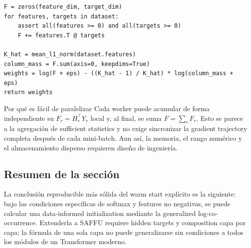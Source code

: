 \begin{lstlisting}[caption={Pseudocódigo shape-first del warm start explícito de una softmax layer}]
F = zeros(feature_dim, target_dim)
for features, targets in dataset:
    assert all(features >= 0) and all(targets >= 0)
    F += features.T @ targets

K_hat = mean_l1_norm(dataset.features)
column_mass = F.sum(axis=0, keepdims=True)
weights = log(F + eps) - ((K_hat - 1) / K_hat) * log(column_mass + eps)
return weights
\end{lstlisting}

\begin{knowledgebox}{Por qué es fácil de paralelizar}
Cada worker puede acumular de forma independiente su $F_r=H_r^\top Y_r$ local y, al final, se suma $F=\sum_rF_r$. Esto se parece a la agregación de sufficient statistics y no exige sincronizar la gradient trajectory completa después de cada mini-batch. Aun así, la memoria, el rango numérico y el almacenamiento disperso requieren diseño de ingeniería.
\end{knowledgebox}


\subsection{Resumen de la sección}

La conclusión reproducible más sólida del warm start explícito es la siguiente: bajo las condiciones específicas de softmax y features no negativas, se puede calcular una data-informed initialization mediante la generalized log-co-occurrence. Extenderla a SAFFU requiere hidden targets y composition capa por capa; la fórmula de una sola capa no puede generalizarse sin condiciones a todos los módulos de un Transformer moderno.
